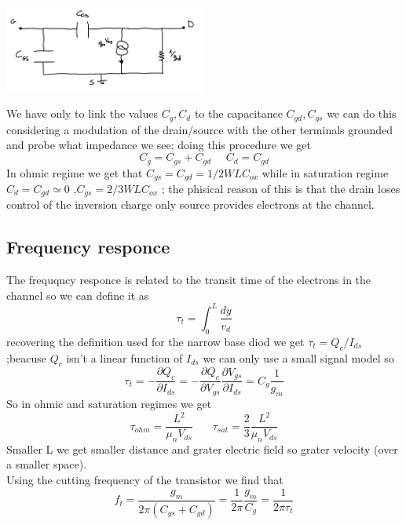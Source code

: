 \centering
\includegraphics[width=0.5\textwidth]{smallsig.png}\\
\raggedright

We have only to link the values $C_g,C_d$ to the capacitance $C_{gd},C_{gs}$ we can do this considering a modulation of the drain/source with the other terminals grounded and probe what impedance we see; doing this procedure we get 
\begin{equation}
C_g=C_{gs}+C_{gd} \ \ \ \ \ \ C_d=C_{gd}
\end{equation}
In ohmic regime we get that $C_{gs}=C_{gd}=1/2WLC_{ox}$ while in saturation regime $C_d=C_{gd}\simeq 0$ ,$C_{gs}=2/3WLC_{ox}$ ; the phisical reason of this is that the drain loses control of the inversion charge only source provides electrons at the channel.\\

\subsection{Frequency responce} 
The frequqncy responce is related to the transit time of the electrons in the channel so we can define it as 
\begin{equation}
\tau_t=\int_0^L \frac{dy}{v_d}
\end{equation}
recovering the definition used for the narrow base diod we get $\tau_t=Q_c/I_{ds}$ ;beacuse $Q_c$ isn't a linear function of $I_{ds}$ we can only use a small signal model so
\begin{equation}
\tau_t= -\frac{\partial Q_c}{\partial I_{ds}}= -\frac{\partial Q_c}{\partial V_{gs}}\frac{\partial V_{gs}}{\partial I_{ds}}=C_g \frac{1}{g_m}
\end{equation}
So in ohmic and saturation regimes we get
\begin{equation}
\tau_{ohm}=\frac{L^2}{\mu_nV_{ds}}\ \ \ \ \ \ \ \ \tau_{sat}=\frac{2}{3} \frac{L^2}{\mu_nV_{ds}}
\end{equation}
Smaller L we get smaller distance and grater electric field so grater velocity (over a smaller space).\\
Using the cutting frequency of the transistor we find that 
\begin{equation}
f_t=\frac{g_m}{2\pi (C_{gs}+C_{gd})}=\frac{1}{2\pi}\frac{g_m}{C_g}=\frac{1}{2\pi \tau_t}
\end{equation}
\vspace{5mm}

